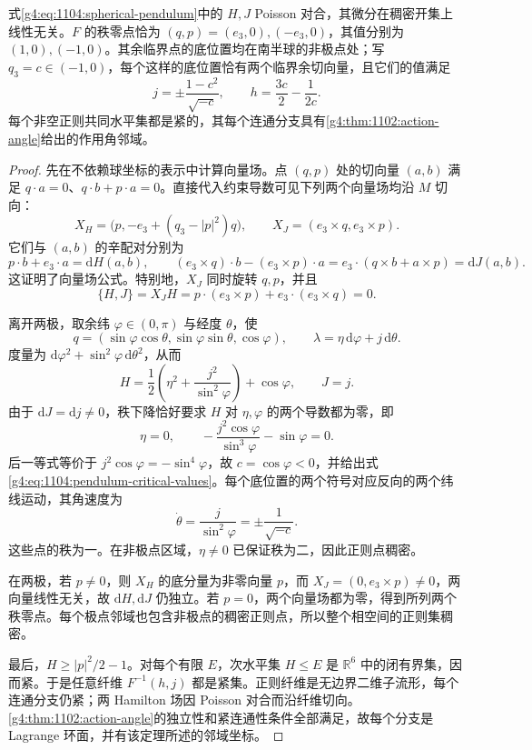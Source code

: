 \begin{proposition}\label{g4:prop:1104:pendulum-critical}
	式\eqref{g4:eq:1104:spherical-pendulum}中的 \(H,J\) Poisson 对合，其微分在稠密开集上线性无关。\(F\) 的秩零点恰为 \((q,p)=(e_3,0),(-e_3,0)\)，其值分别为 \((1,0),(-1,0)\)。其余临界点的底位置均在南半球的非极点处；写 \(q_3=c\in(-1,0)\)，每个这样的底位置恰有两个临界余切向量，且它们的值满足
	\begin{equation}\label{g4:eq:1104:pendulum-critical-values}
		j=\pm\frac{1-c^2}{\sqrt{-c}},
		\qquad h=\frac{3c}{2}-\frac1{2c}.
	\end{equation}
	每个非空正则共同水平集都是紧的，其每个连通分支具有\cref{g4:thm:1102:action-angle}给出的作用角邻域。
\end{proposition}
\begin{proof}
	先在不依赖球坐标的表示中计算向量场。点 \((q,p)\) 处的切向量 \((a,b)\) 满足 \(q\cdot a=0\)、\(q\cdot b+p\cdot a=0\)。直接代入约束导数可见下列两个向量场均沿 \(M\) 切向：
	\begin{equation}\label{g4:eq:1104:pendulum-fields}
		X_H=\bigl(p,-e_3+(q_3-|p|^2)q\bigr),
		\qquad X_J=(e_3\times q,e_3\times p).
	\end{equation}
	它们与 \((a,b)\) 的辛配对分别为
	\[
		p\cdot b+e_3\cdot a=\mathrm{d}H(a,b),\qquad
		(e_3\times q)\cdot b-(e_3\times p)\cdot a
		=e_3\cdot(q\times b+a\times p)=\mathrm{d}J(a,b).
	\]
	这证明了向量场公式。特别地，\(X_J\) 同时旋转 \(q,p\)，并且
	\[
		\{H,J\}=X_JH=p\cdot(e_3\times p)+e_3\cdot(e_3\times q)=0.
	\]

	离开两极，取余纬 \(\varphi\in(0,\pi)\) 与经度 \(\theta\)，使
	\[
		q=(\sin\varphi\cos\theta,\sin\varphi\sin\theta,\cos\varphi),
		\qquad \lambda=\eta\,\mathrm{d}\varphi+j\,\mathrm{d}\theta.
	\]
	度量为 \(\mathrm{d}\varphi^2+\sin^2\varphi\,\mathrm{d}\theta^2\)，从而
	\begin{equation}\label{g4:eq:1104:pendulum-spherical-coordinates}
		H=\frac12\left(\eta^2+\frac{j^2}{\sin^2\varphi}\right)+\cos\varphi,
		\qquad J=j.
	\end{equation}
	由于 \(\mathrm{d}J=\mathrm{d}j\ne0\)，秩下降恰好要求 \(H\) 对 \(\eta,\varphi\) 的两个导数都为零，即
	\[
		\eta=0,
		\qquad -\frac{j^2\cos\varphi}{\sin^3\varphi}-\sin\varphi=0.
	\]
	后一等式等价于 \(j^2\cos\varphi=-\sin^4\varphi\)，故 \(c=\cos\varphi<0\)，并给出式\eqref{g4:eq:1104:pendulum-critical-values}。每个底位置的两个符号对应反向的两个纬线运动，其角速度为
	\[
		\dot\theta=\frac{j}{\sin^2\varphi}=\pm\frac1{\sqrt{-c}}.
	\]
	这些点的秩为一。在非极点区域，\(\eta\ne0\) 已保证秩为二，因此正则点稠密。

	在两极，若 \(p\ne0\)，则 \(X_H\) 的底分量为非零向量 \(p\)，而 \(X_J=(0,e_3\times p)\ne0\)，两向量线性无关，故 \(\mathrm{d}H,\mathrm{d}J\) 仍独立。若 \(p=0\)，两个向量场都为零，得到所列两个秩零点。每个极点邻域也包含非极点的稠密正则点，所以整个相空间的正则集稠密。

	最后，\(H\ge |p|^2/2-1\)。对每个有限 \(E\)，次水平集 \(H\le E\) 是 \(\mathbb R^6\) 中的闭有界集，因而紧。于是任意纤维 \(F^{-1}(h,j)\) 都是紧集。正则纤维是无边界二维子流形，每个连通分支仍紧；两 Hamilton 场因 Poisson 对合而沿纤维切向。\cref{g4:thm:1102:action-angle}的独立性和紧连通性条件全部满足，故每个分支是 Lagrange 环面，并有该定理所述的邻域坐标。
\end{proof}


